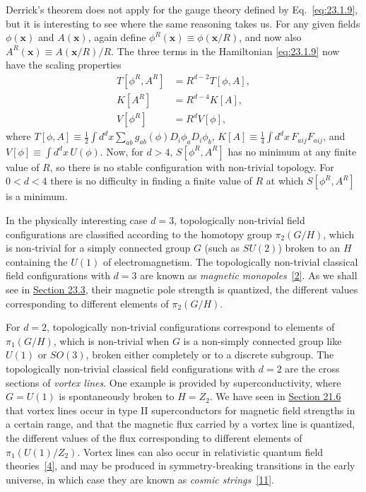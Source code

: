 Derrick's theorem does not apply for the gauge theory defined by
Eq.~\eqref{eq:23.1.9}, but it is interesting to see where the same reasoning
takes us. For any given fields $\phi(\mathbf{x})$ and $A(\mathbf{x})$,
again define $\phi^R(\mathbf{x})\equiv\phi(\mathbf{x}/R)$, and now also
$A^R(\mathbf{x})\equiv A(\mathbf{x}/R)/R$. The three terms in the
Hamiltonian \eqref{eq:23.1.9} now have the scaling properties
\[
 \begin{split}
  T[\phi^R,A^R]&=R^{d-2}T[\phi,A],\\
  K[A^R]&=R^{d-4}K[A],\\
  V[\phi^R]&=R^dV[\phi],
 \end{split}
\]
where
$T[\phi,A]\equiv\frac{1}{2}\int d^d x
\sum_{ab}g_{ab}(\phi)D_i\phi_aD_i\phi_b$,\newline
$K[A]\equiv\frac{1}{4}\int d^d x\,F_{a ij}F_{a ij}$, and
$V[\phi]\equiv\int d^d x\,U(\phi)$. Now, for $d>4$,
$S[\phi^R,A^R]$ has no minimum at any finite value of $R$, so there is no
stable configuration with non-trivial topology. For $0<d<4$ there is no
difficulty in finding a finite value of $R$ at which $S[\phi^R,A^R]$ is a
minimum.

In the physically interesting case $d=3$, topologically non-trivial field
configurations are classified according to the homotopy group
$\pi_2(G/H)$, which is non-trivial for a simply connected group $G$ (such
as $SU(2)$) broken to an $H$ containing the $U(1)$ of electromagnetism. The
topologically non-trivial classical field configurations with $d=3$ are
known as \emph{magnetic monopoles}~\hyperref[ch23-ref-2]{[2]}. As we shall
see in \hyperref[sec:23.3]{Section 23.3}, their magnetic pole strength is
quantized, the different values corresponding to different elements of
$\pi_2(G/H)$.

For $d=2$, topologically non-trivial configurations correspond to elements
of $\pi_1(G/H)$, which is non-trivial when $G$ is a non-simply connected
group like $U(1)$ or $SO(3)$, broken either completely or to a discrete
subgroup. The topologically non-trivial classical field configurations with
$d=2$ are the cross sections of \emph{vortex lines}. One example is
provided by superconductivity, where $G=U(1)$ is spontaneously broken to
$H=Z_2$. We have seen in \hyperref[sec:21.6]{Section 21.6} that vortex
lines occur in type II superconductors for magnetic field strengths in a
certain range, and that the magnetic flux carried by a vortex line is
quantized, the different values of the flux corresponding to different
elements of $\pi_1(U(1)/Z_2)$. Vortex lines can also occur in relativistic
quantum field theories~\hyperref[ch23-ref-4]{[4]}, and may be produced in
symmetry-breaking transitions in the early universe, in which case they are
known as \emph{cosmic strings}~\hyperref[ch23-ref-11]{[11]}.

